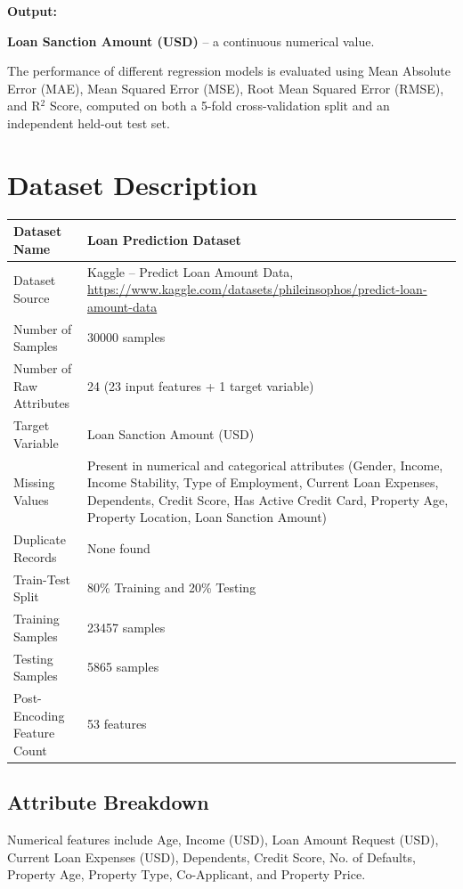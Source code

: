 \documentclass[12pt,a4paper]{article}
\begin{document}
\textbf{Output:}

\begin{center}
\textbf{Loan Sanction Amount (USD)} -- a continuous numerical value.
\end{center}

The performance of different regression models is evaluated using Mean Absolute Error (MAE), Mean Squared Error (MSE), Root Mean Squared Error (RMSE), and R$^2$ Score, computed on both a 5-fold cross-validation split and an independent held-out test set.

\section{Dataset Description}

\begin{longtable}{|p{6cm}|p{8cm}|}
\hline
Dataset Name & Loan Prediction Dataset \\ \hline
Dataset Source & Kaggle -- Predict Loan Amount Data, \url{https://www.kaggle.com/datasets/phileinsophos/predict-loan-amount-data} \\ \hline
Number of Samples & 30000 samples \\ \hline
Number of Raw Attributes & 24 (23 input features + 1 target variable) \\ \hline
Target Variable & Loan Sanction Amount (USD) \\ \hline
Missing Values & Present in numerical and categorical attributes (Gender, Income, Income Stability, Type of Employment, Current Loan Expenses, Dependents, Credit Score, Has Active Credit Card, Property Age, Property Location, Loan Sanction Amount) \\ \hline
Duplicate Records & None found \\ \hline
Train-Test Split & 80\% Training and 20\% Testing \\ \hline
Training Samples & 23457 samples \\ \hline
Testing Samples & 5865 samples \\ \hline
Post-Encoding Feature Count & 53 features \\ \hline
\end{longtable}

\subsection*{Attribute Breakdown}

Numerical features include Age, Income (USD), Loan Amount Request (USD), Current Loan Expenses (USD), Dependents, Credit Score, No. of Defaults, Property Age, Property Type, Co-Applicant, and Property Price.
\end{document}
